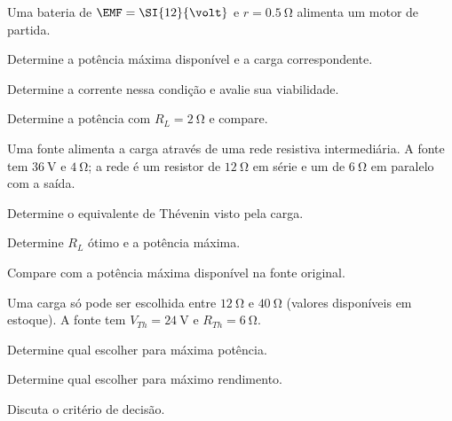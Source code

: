 \begin{questao}[3]{}

Uma bateria de $\EMF=\SI{12}{\volt}$ e $r=\SI{0.5}{\ohm}$ alimenta um motor de
partida.
\begin{itensq}
\item Determine a potência máxima disponível e a carga correspondente.
\item Determine a corrente nessa condição e avalie sua viabilidade.
\item Determine a potência com $R_L=\SI{2}{\ohm}$ e compare.
\end{itensq}


\end{questao}
\begin{questao}[3]{}

Uma fonte alimenta a carga através de uma rede resistiva intermediária. A fonte
tem $\SI{36}{\volt}$ e $\SI{4}{\ohm}$; a rede é um resistor de
$\SI{12}{\ohm}$ em série e um de $\SI{6}{\ohm}$ em paralelo com a saída.
\begin{itensq}
\item Determine o equivalente de Thévenin visto pela carga.
\item Determine $R_L$ ótimo e a potência máxima.
\item Compare com a potência máxima disponível na fonte original.
\end{itensq}


\end{questao}
\begin{questao}[3]{}

Uma carga só pode ser escolhida entre $\SI{12}{\ohm}$ e $\SI{40}{\ohm}$
(valores disponíveis em estoque). A fonte tem $V_{Th}=\SI{24}{\volt}$ e
$R_{Th}=\SI{6}{\ohm}$.
\begin{itensq}
\item Determine qual escolher para máxima potência.
\item Determine qual escolher para máximo rendimento.
\item Discuta o critério de decisão.
\end{itensq}


\end{questao}
